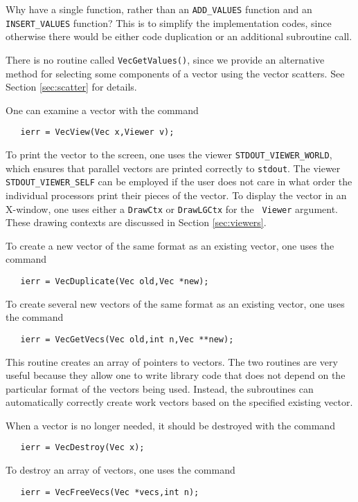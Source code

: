 \begin{design}
Why have a single function, rather than an {\tt ADD\_VALUES} function and 
an {\tt INSERT\_VALUES} function?  This is to simplify the implementation 
codes, since otherwise there would be either code duplication or 
an additional subroutine call.
\end{design}

There is no routine called {\tt VecGetValues()}, since we provide 
an alternative method for selecting some components of a vector using
the vector scatters.  See Section \ref{sec:scatter} for details.

One can examine a vector with the command 
\begin{verbatim}
   ierr = VecView(Vec x,Viewer v);
\end{verbatim}
To print the vector to the screen, one uses the viewer
 {\tt STDOUT\_VIEWER\_WORLD}, which ensures
that parallel vectors are printed correctly to {\tt stdout}.  The
viewer {\tt STDOUT\_VIEWER\_SELF}  can be employed if
the user does not care in what order the individual processors print
their pieces of the vector.  To display the vector in an X-window,
one uses either a {\tt DrawCtx} or {\tt DrawLGCtx} for the {\tt
Viewer} argument.  These drawing contexts are discussed in Section
\ref{sec:viewers}.

To create a new vector of the same format as an existing vector, one uses
the command 
\begin{verbatim}
   ierr = VecDuplicate(Vec old,Vec *new);
\end{verbatim}
To create several new vectors of the same format as an existing vector,
one uses the command 
\begin{verbatim}
   ierr = VecGetVecs(Vec old,int n,Vec **new);
\end{verbatim}
This routine creates an array of pointers to vectors. The two routines 
are very useful because they allow one to write library code that does 
not depend on the particular format of the vectors being used. Instead,
the subroutines can automatically correctly create work vectors
based on the specified existing vector.

When a vector is no longer needed, it should be destroyed with the 
command 
\begin{verbatim}
   ierr = VecDestroy(Vec x);
\end{verbatim}
To destroy an array of vectors, one uses the command 
\begin{verbatim}
   ierr = VecFreeVecs(Vec *vecs,int n);
\end{verbatim}

